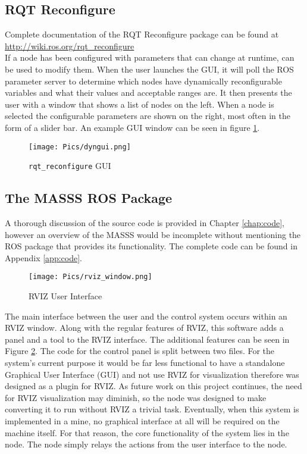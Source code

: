 \subsection{RQT Reconfigure}

Complete documentation of the RQT Reconfigure package can be found at \url{http://wiki.ros.org/rqt_reconfigure}\\

If a node has been configured with parameters that can change at runtime,  can be used to modify them. When the user launches the GUI, it will poll the ROS parameter server to determine which nodes have dynamically reconfigurable variables and what their values and acceptable ranges are. It then presents the user with a window that shows a list of nodes on the left. When a node is selected the configurable parameters are shown on the right, most often in the form of a slider bar. An example  GUI window can be seen in figure \ref{fig:dyngui2}.

\begin{figure}[h]
    \centering
    \texttt{[image: Pics/dyngui.png]}
    \caption{\texttt{rqt\_reconfigure} GUI}
    \label{fig:dyngui2}
\end{figure}

\subsection{The MASSS ROS Package}
\label{sub:software}

A thorough discussion of the source code is provided in Chapter \ref{chap:code}, however an overview of the MASSS would be incomplete without mentioning the ROS package that provides its functionality. The complete code can be found in Appendix \ref{app:code}.\\ 

\begin{figure}[H]
    \centering
    \texttt{[image: Pics/rviz\_window.png]}
    \caption{RVIZ User Interface}
    \label{fig:panel}
\end{figure}

The main interface between the user and the control system occurs within an RVIZ window. Along with the regular features of RVIZ, this software adds a panel and a tool to the RVIZ interface. The additional features can be seen in Figure \ref{fig:panel}. The code for the control panel is split between two files. For the system's current purpose it would be far less functional to have a standalone Graphical User Interface (GUI) and not use RVIZ for visualization therefore  was designed as a plugin for RVIZ. As future work on this project continues, the need for RVIZ visualization may diminish, so the node was designed to make converting it to run without RVIZ a trivial task. Eventually, when this system is implemented in a mine, no graphical interface at all will be required on the machine itself. For that reason, the core functionality of the system lies in the  node. The  node simply relays the actions from the user interface to the  node.\\

